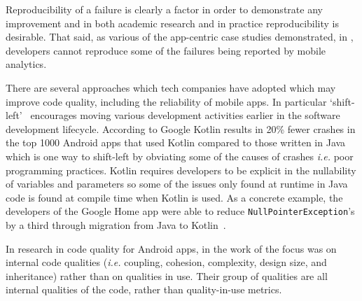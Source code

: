 Reproducibility of a failure is clearly a factor in order to demonstrate any improvement and in both academic research and in practice reproducibility is desirable. That said, as various of the app-centric case studies demonstrated, in , developers cannot reproduce some of the failures being reported by mobile analytics. %

There are several approaches which tech companies have adopted which may improve code quality, including the reliability of mobile apps. In particular `shift-left'~ encourages moving various development activities earlier in the software development lifecycle. According to Google Kotlin results in 20\% fewer crashes in the top 1000 Android apps that used Kotlin compared to those written in Java~ which is one way to shift-left by obviating some of the causes of crashes \emph{i.e.} poor programming practices. Kotlin requires developers to be explicit in the nullability of variables and parameters so some of the issues only found at runtime in Java code is found at compile time when Kotlin is used. As a concrete example, the developers of the Google Home app were able to reduce \texttt{NullPointerException}'s by a third through migration from Java to Kotlin~.


In research in code quality for Android apps, in the work of  the focus was on internal code qualities (\emph{i.e.} coupling, cohesion, complexity, design size, and inheritance) rather than on qualities in use. Their group of qualities are all internal qualities of the code, rather than quality-in-use metrics. 

